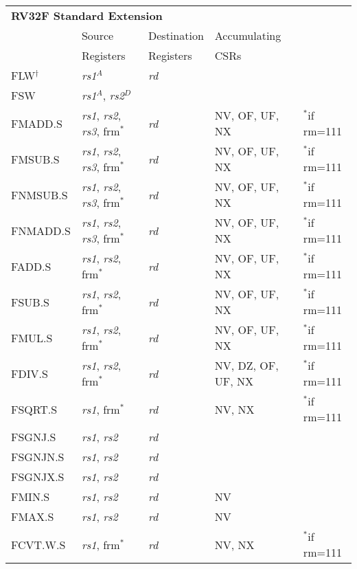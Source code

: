 \begin{tabular}{p{3cm}|p{3cm}|p{2cm}|p{4cm}|p{4cm}}
  \multicolumn{4}{l}{\bf RV32F Standard Extension} \\
  \cline{2-4}
   & Source    & Destination & Accumulating \\
   & Registers & Registers   & CSRs \\
  \cline{2-4}
   FLW$^\dagger$ & {\em rs1}$^A$ & {\em rd} & & \\
   \cline{2-4}
   FSW & {\em rs1}$^A$, {\em rs2}$^D$ &  &   & \\
   \cline{2-4}
   FMADD.S & {\em rs1}, {\em rs2},  {\em rs3}, frm$^*$ & {\em rd} & NV, OF, UF, NX & $^*$if rm=111 \\
   \cline{2-4}
   FMSUB.S & {\em rs1}, {\em rs2},  {\em rs3}, frm$^*$ & {\em rd} & NV, OF, UF, NX & $^*$if rm=111  \\
   \cline{2-4}
   FNMSUB.S & {\em rs1}, {\em rs2},  {\em rs3}, frm$^*$ & {\em rd} & NV, OF, UF, NX & $^*$if rm=111  \\
   \cline{2-4}
   FNMADD.S & {\em rs1}, {\em rs2},  {\em rs3}, frm$^*$ & {\em rd} & NV, OF, UF, NX & $^*$if rm=111  \\
   \cline{2-4}
   FADD.S & {\em rs1}, {\em rs2}, frm$^*$ & {\em rd} & NV, OF, UF, NX & $^*$if rm=111  \\
   \cline{2-4}
   FSUB.S & {\em rs1}, {\em rs2}, frm$^*$ & {\em rd} & NV, OF, UF, NX & $^*$if rm=111  \\
   \cline{2-4}
   FMUL.S & {\em rs1}, {\em rs2}, frm$^*$ & {\em rd} & NV, OF, UF, NX & $^*$if rm=111  \\
   \cline{2-4}
   FDIV.S & {\em rs1}, {\em rs2}, frm$^*$ & {\em rd} & NV, DZ, OF, UF, NX & $^*$if rm=111  \\
   \cline{2-4}
   FSQRT.S & {\em rs1}, frm$^*$ & {\em rd} & NV, NX & $^*$if rm=111  \\
   \cline{2-4}
   FSGNJ.S & {\em rs1}, {\em rs2} & {\em rd} &   & \\
   \cline{2-4}
   FSGNJN.S & {\em rs1}, {\em rs2} & {\em rd} &   & \\
   \cline{2-4}
   FSGNJX.S & {\em rs1}, {\em rs2} & {\em rd} &   & \\
   \cline{2-4}
   FMIN.S & {\em rs1}, {\em rs2} & {\em rd} & NV &   \\
   \cline{2-4}
   FMAX.S & {\em rs1}, {\em rs2} & {\em rd} & NV &   \\
   \cline{2-4}
   FCVT.W.S & {\em rs1}, frm$^*$ & {\em rd} & NV, NX & $^*$if rm=111  \\
   \cline{2-4}

\end{tabular}

